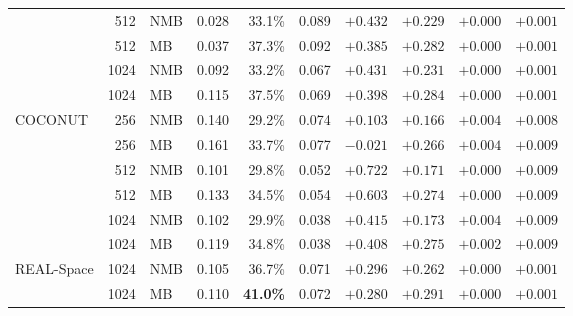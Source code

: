 \begin{table}[htbp]
\begin{tabular}{@{}l r l r r r r r r r@{}}
     & 512 & NMB & 0.028 & 33.1\% & 0.089 & $+0.432$ & $+0.229$ & $+0.000$ & $+0.001$ \\
     & 512 & MB & 0.037 & 37.3\% & 0.092 & $+0.385$ & $+0.282$ & $+0.000$ & $+0.001$ \\
     & 1024 & NMB & 0.092 & 33.2\% & 0.067 & $+0.431$ & $+0.231$ & $+0.000$ & $+0.001$ \\
     & 1024 & MB & 0.115 & 37.5\% & 0.069 & $+0.398$ & $+0.284$ & $+0.000$ & $+0.001$ \\
    \addlinespace
    COCONUT & 256 & NMB & 0.140 & 29.2\% & 0.074 & $+0.103$ & $+0.166$ & $+0.004$ & $+0.008$ \\
     & 256 & MB & 0.161 & 33.7\% & 0.077 & $-0.021$ & $+0.266$ & $+0.004$ & $+0.009$ \\
     & 512 & NMB & 0.101 & 29.8\% & 0.052 & $+0.722$ & $+0.171$ & $+0.000$ & $+0.009$ \\
     & 512 & MB & 0.133 & 34.5\% & 0.054 & $+0.603$ & $+0.274$ & $+0.000$ & $+0.009$ \\
     & 1024 & NMB & 0.102 & 29.9\% & 0.038 & $+0.415$ & $+0.173$ & $+0.004$ & $+0.009$ \\
     & 1024 & MB & 0.119 & 34.8\% & 0.038 & $+0.408$ & $+0.275$ & $+0.002$ & $+0.009$ \\
    \addlinespace
    REAL-Space & 1024 & NMB & 0.105 & 36.7\% & 0.071 & $+0.296$ & $+0.262$ & $+0.000$ & $+0.001$ \\
     & 1024 & MB & 0.110 & \textbf{41.0\%} & 0.072 & $+0.280$ & $+0.291$ & $+0.000$ & $+0.001$ \\
    \bottomrule
  \end{tabular}
\end{table}
